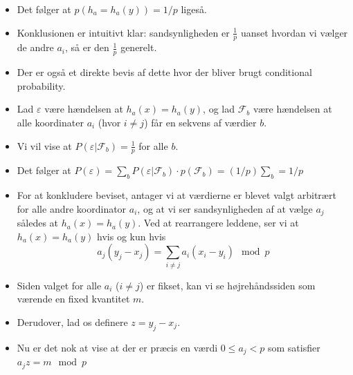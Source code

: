 \documentclass{beamer}
\begin{document}
\begin{frame}[allowframebreaks]
\begin{itemize}
\item Det følger at $p(h_{a} = h_{a}(y))= 1/p$ ligeså.
\item Konklusionen er intuitivt klar: sandsynligheden er $\frac{1}{p}$ uanset hvordan vi vælger de andre $a_{i}$, så er den $\frac{1}{p}$ generelt.
\item Der er også et direkte bevis af dette hvor der bliver brugt conditional probability.
\item Lad $\varepsilon$ være hændelsen at $h_{a}(x) = h_{a}(y)$, og lad $\mathcal{F}_{b}$ være hændelsen at alle koordinater $a_{i}$ (hvor $i \neq j$) får en sekvens af værdier $b$.
\item Vi vil vise at $P(\varepsilon | \mathcal{F}_{b}) = \frac{1}{p}$ for alle $b$.
\item Det følger at $P(\varepsilon) = \sum_{b}^{} P(\varepsilon | \mathcal{F}_{b}) \cdot p(\mathcal{F}_{b}) = (1/p) \sum_{b}^{} = 1/p$
\item For at konkludere beviset, antager vi at værdierne er blevet valgt arbitrært for alle andre koordinator $a_{i}$, og at vi ser sandsynligheden af at vælge $a_{j}$ således at $h_{a}(x) = h_{a}(y)$. Ved at rearrangere leddene, ser vi at $h_{a}(x) = h_{a}(y)$ hvis og kun hvis
  \[ a_{j}(y_{j} - x_{j}) = \sum_{i \neq j}^{} a_{i}(x_{i}- y_{i}) \mod p \]
  \item Siden valget for alle $a_{i}$ ($i \neq j$) er fikset, kan vi se højrehåndssiden som værende en fixed kvantitet $m$. 
  \item Derudover, lad os definere $z = y_{j} - x_{j}$. 
  \item Nu er det nok at vise at der er præcis en værdi $0 \leq a_{j} < p$ som satisfier $a_{j}z = m \mod p$
\end{itemize}

\end{frame}
\end{document}
